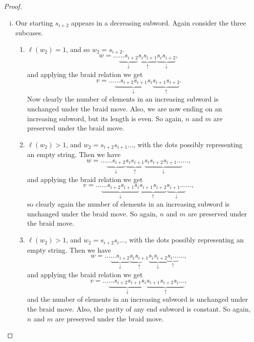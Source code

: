 \documentclass[11pt]{article}
\begin{document}
\begin{proof}
\begin{enumerate}[(i)]
\begin{enumerate}
        \item $\ell(w_2)>1$, and $w_2=s_{i+2}s_i\hdots$, with the dots possibly representing an empty string. Then we have 
        \[w=\hdots\underbrace{\hdots s_{i+2}s_is_{i+1}}_\uparrow\underbrace{s_is_{i+2}s_{i+1}}_\downarrow\underbrace{s_i\hdots}_\uparrow\hdots,\]
        and, applying the braid relation, we get
        \[v=\hdots\underbrace{\hdots s_{i+2}}_\uparrow\underbrace{s_{i+1}s_i}_\downarrow\underbrace{s_{i+1}s_{i+2}s_i\hdots}_\uparrow\hdots,\]
        which preserves $u$ and the parity of any end subword. 

    
        \end{enumerate}
        \item Our starting $s_{i+2}$ appears in a decreasing subword. Again consider the three subcases.
        \begin{enumerate}
            \item $\ell(w_2)=1$, and so $w_2=s_{i+2}$.
        \[w=\hdots\underbrace{\hdots s_{i+2}}_\downarrow\underbrace{s_is_{i+1}}_\uparrow\underbrace{s_is_{i+2}}_\downarrow,\]
        and applying the braid relation we get
        \[v=\hdots\underbrace{\hdots s_{i+2}s_{i+1}s_i}_\downarrow\underbrace{s_{i+1}s_{i+2}}_\uparrow.\]
        Now clearly the number of elements in an increasing subword is unchanged under the braid move. Also, we are now ending on an increasing subword, but its length is even. So again, $n$ and $m$ are preserved under the braid move. 

         \item $\ell(w_2)>1$, and $w_2=s_{i+2}s_{i+1}\hdots$, with the dots possibly representing an empty string. Then we have 
        \[w=\hdots\underbrace{\hdots s_{i+2}}_\downarrow\underbrace{s_is_{i+1}}_\uparrow\underbrace{s_is_{i+2}s_{i+1}\hdots}_\downarrow\hdots,\]
        and applying the braid relation we get
        \[v=\hdots\underbrace{\hdots s_{i+2}s_{i+1}s_i}_\downarrow\underbrace{s_{i+1}s_{i+2}}_\uparrow\underbrace{s_{i+1}\hdots}_\downarrow\hdots,\]
        so clearly again the number of elements in an increasing subword is unchanged under the braid move. So again, $n$ and $m$ are preserved under the braid move. 


        \item $\ell(w_2)>1$, and $w_2=s_{i+2}s_i\hdots$, with the dots possibly representing an empty string. Then we have 
        \[w=\hdots\underbrace{\hdots s_{i+2}}_\downarrow\underbrace{s_is_{i+1}}_\uparrow\underbrace{s_is_{i+2}}_\downarrow\underbrace{s_i\hdots}_\uparrow\hdots,\]
        and applying the braid relation we get
        \[v=\hdots\underbrace{\hdots s_{i+2}s_{i+1}s_i}_\downarrow\underbrace{s_{i+1}s_{i+2}s_i\hdots}_\uparrow,\]
        and the number of elements in an increasing subword is unchanged under the braid move. Also, the parity of any end subword is constant. So again, $n$ and $m$ are preserved under the braid move. 









\end{enumerate}
\end{enumerate}
\end{proof}
\end{document}

